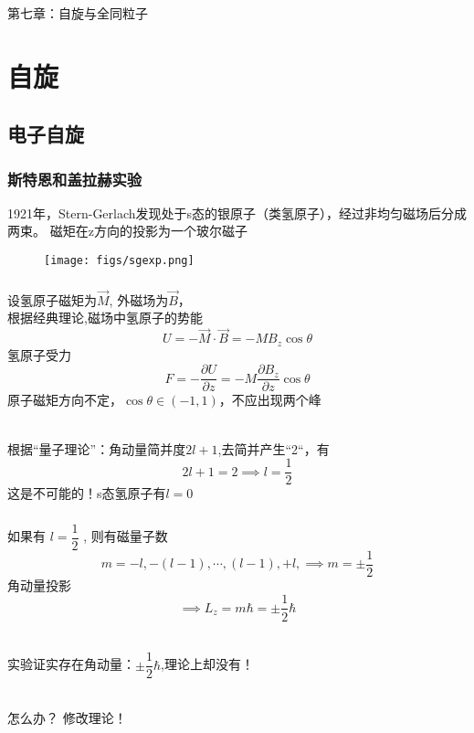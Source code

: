 \begin{frame} [plain]
    \frametitle{}
    \begin{center}
    { {\huge 第七章：自旋与全同粒子 }}
    \end{center}  
    \addtocounter{framenumber}{-1}   
\end{frame}

\section{自旋 }
\subsection{电子自旋}
\begin{frame}
  \frametitle{斯特恩和盖拉赫实验}
  1921年，Stern-Gerlach发现处于s态的银原子（类氢原子），经过非均匀磁场后分成两束。 磁矩在z方向的投影为一个玻尔磁子
\begin{figure}[htbp]
  \centering
  \texttt{[image: figs/sgexp.png]}
\end{figure}
\end{frame} 

\begin{frame}[label=current]
  \frametitle{}
\emf[分析：] 设氢原子磁矩为$\vec{M} $, 外磁场为$\vec{B}$，\\
根据经典理论,磁场中氢原子的势能
\[ U= - \vec{M} \cdot \vec{B} = -MB_z \cos\theta \] 
氢原子受力
\[ F= -\frac{\partial U}{\partial z } = -M \frac{\partial B_z}{\partial z }  \cos\theta \] 
原子磁矩方向不定，$\cos\theta \in (-1, 1)$，不应出现两个峰 

~~\\ 
根据“量子理论”：角动量简并度$2l+1$,去简并产生“2“，有
\[2l+1 =2 \implies l=\frac{1}{2}\]
这是不可能的！s态氢原子有$l=0$
\end{frame} 

\begin{frame}[label=current]
  \frametitle{}
如果有 $ l=\dfrac{1}{2}  $ , 则有磁量子数
\[ m=-l, -(l-1), \cdots, (l-1), +l, \implies m=\pm \frac{1}{2}\]
角动量投影
\[\implies L_z = m\hbar = \pm \frac{1}{2}\hbar\]

~~\\ 
实验证实存在角动量：$\pm \dfrac{1}{2}\hbar$,理论上却没有！

~~\\ 
怎么办？ 修改理论！
\end{frame} 


